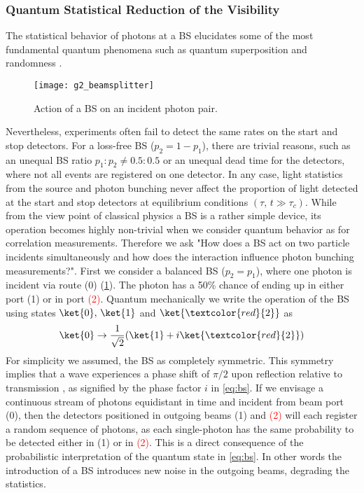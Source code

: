 \subsubsection{Quantum Statistical Reduction of the Visibility}\label{sec:beamsplittercorr}
The statistical behavior of photons at a \ac{BS} elucidates some of the most fundamental quantum phenomena such as quantum superposition and
randomness \cite{weihs_photon_2001}.
\begin{figure}[htp]
	\centering
	\texttt{[image: g2\_beamsplitter]}
	\caption{Action of a \ac{BS} on an incident photon pair.}
	\label{fig:g2_beamsplitter}
\end{figure}
\noindent Nevertheless, experiments often fail to detect the same rates on the start and stop detectors. For a loss-free \ac{BS} ($p_2=1-p_1$), there are trivial reasons, such as an unequal \ac{BS} ratio $p_1:p_2\neq 0.5:0.5$ or an unequal dead time for the detectors, where not all events are registered on one detector. In any case, light statistics from the source and photon bunching never affect the proportion of light detected at the start and stop detectors at equilibrium conditions $(\tau,\, t\gg\tau_c)$. While from the view point of classical physics a \ac{BS} is a rather simple device, its operation becomes highly non-trivial when we consider quantum behavior as for correlation measurements. Therefore we ask "How does a \ac{BS} act on two particle incidents simultaneously and how does the interaction influence photon bunching measurements?". First we consider a balanced \ac{BS} ($p_2=p_1$), where one photon is incident via route (0) (\cref{fig:g2_beamsplitter}). The photon has a 50\% chance of ending up in either port (1) or in port \textcolor{red}{(2)}. Quantum mechanically we write the operation of the \ac{BS} using states $\ket{0},\,\ket{1}$ and $\ket{\textcolor{red}{2}}$ as
\begin{equation}\label{eq:bs}
	\ket{0}\rightarrow\dfrac{1}{\sqrt{2}}(\ket{1}+i\ket{\textcolor{red}{2}})
\end{equation}
For simplicity we assumed, the \ac{BS} as completely symmetric. This symmetry implies that a wave experiences a phase shift of $\pi/2$ upon reflection relative to transmission \cite{weihs_photon_2001}, as signified by the phase factor $i$ in \cref{eq:bs}. If we envisage a continuous stream of photons equidistant in time and incident from beam port (0), then the detectors positioned in outgoing beams (1) and \textcolor{red}{(2)} will each register a random sequence of photons, as each single-photon has the same probability to be detected either in (1) or in \textcolor{red}{(2)}. This is a direct consequence of the probabilistic interpretation of the quantum state in \cref{eq:bs}. In other words the introduction of a \ac{BS} introduces new noise in the outgoing beams, degrading the statistics.\\
